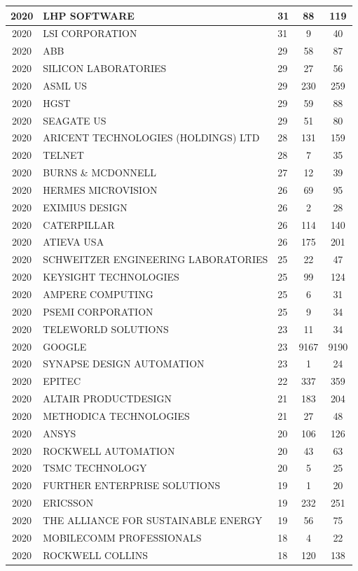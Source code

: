 \documentclass{article}%
\begin{document}
\begin{longtable}{c|p{20em}|p{5em}|c|c}
\hline%
2020&LHP SOFTWARE&31&88&119\\%
\hline%
2020&LSI CORPORATION&31&9&40\\%
\hline%
2020&ABB&29&58&87\\%
\hline%
2020&SILICON LABORATORIES&29&27&56\\%
\hline%
2020&ASML US&29&230&259\\%
\hline%
2020&HGST&29&59&88\\%
\hline%
2020&SEAGATE US&29&51&80\\%
\hline%
2020&ARICENT TECHNOLOGIES (HOLDINGS) LTD&28&131&159\\%
\hline%
2020&TELNET&28&7&35\\%
\hline%
2020&BURNS \& MCDONNELL&27&12&39\\%
\hline%
2020&HERMES MICROVISION&26&69&95\\%
\hline%
2020&EXIMIUS DESIGN&26&2&28\\%
\hline%
2020&CATERPILLAR&26&114&140\\%
\hline%
2020&ATIEVA USA&26&175&201\\%
\hline%
2020&SCHWEITZER ENGINEERING LABORATORIES&25&22&47\\%
\hline%
2020&KEYSIGHT TECHNOLOGIES&25&99&124\\%
\hline%
2020&AMPERE COMPUTING&25&6&31\\%
\hline%
2020&PSEMI CORPORATION&25&9&34\\%
\hline%
2020&TELEWORLD SOLUTIONS&23&11&34\\%
\hline%
2020&GOOGLE&23&9167&9190\\%
\hline%
2020&SYNAPSE DESIGN AUTOMATION&23&1&24\\%
\hline%
2020&EPITEC&22&337&359\\%
\hline%
2020&ALTAIR PRODUCTDESIGN&21&183&204\\%
\hline%
2020&METHODICA TECHNOLOGIES&21&27&48\\%
\hline%
2020&ANSYS&20&106&126\\%
\hline%
2020&ROCKWELL AUTOMATION&20&43&63\\%
\hline%
2020&TSMC TECHNOLOGY&20&5&25\\%
\hline%
2020&FURTHER ENTERPRISE SOLUTIONS&19&1&20\\%
\hline%
2020&ERICSSON&19&232&251\\%
\hline%
2020&THE ALLIANCE FOR SUSTAINABLE ENERGY&19&56&75\\%
\hline%
2020&MOBILECOMM PROFESSIONALS&18&4&22\\%
\hline%
2020&ROCKWELL COLLINS&18&120&138\\%

\end{longtable}
\end{document}
